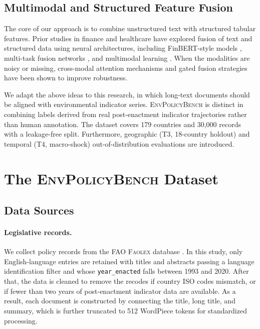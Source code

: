 \documentclass[11pt]{article}
\newcommand{\bench}{\textsc{EnvPolicyBench}}
\begin{document}
\subsection{Multimodal and Structured Feature Fusion}

The core of our approach is to combine  unstructured text with structured tabular features. Prior studies in finance and healthcare have explored fusion of text and structured data using neural architectures, including FinBERT-style models \citep{yang2020finbert}, multi-task fusion networks \citep{sawhney2021finmtl}, and multimodal learning \citep{khadanga2019sensefusion}. When the modalities are noisy or missing, cross-modal attention mechanisms \citep{tsai2019multimodal} and gated fusion strategies \citep{arevalo2017gated} have been shown to improve robustness.

We adapt the above ideas to this research, in which long-text documents should be aligned with environmental indicator series. \bench{} is distinct in combining labels derived from real post-enactment indicator trajectories rather than human annotation. The dataset covers 179 countries and 30{,}000 records with a leakage-free split. Furthermore, geographic (T3, 18-country holdout) and temporal (T4, macro-shock) out-of-distribution evaluations are introduced. 


\section{The \bench{} Dataset}
\label{sec:dataset}

\subsection{Data Sources}
\label{sec:data-sources}

\paragraph{Legislative records.}
We collect policy records from the FAO \textsc{Faolex} database \citep{faolex2024}.  In this study,  only English-language entries are retained with titles and abstracts passing a language identification filter and whose \texttt{year\_enacted} falls between 1993 and 2020. After that, the data is cleaned to remove the recodes if country ISO codes mismatch, or if fewer than two years of post-enactment indicator data are available. As a result, each document is constructed by connecting the title, long title, and summary, which is further truncated to 512 WordPiece tokens for standardized processing.
\end{document}
